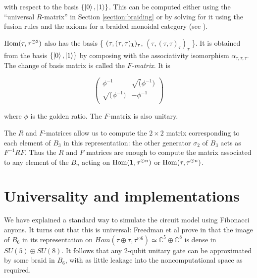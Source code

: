 with respect to the basis $\left\{ \left|0\right>, \left|1\right> \right\}$. This can be
computed either using the ``universal $R$-matrix'' in Section \ref{section:braiding} or
by solving for it using the fusion rules and the axioms for a braided monoidal
category (see \cite{Panangaden}).

$\operatorname{Hom}(\tau, \tau^{\odot 3})$ also has the basis \{ $(\tau,
(\tau,\tau)_{\mathbf{1}})_\tau$, $(\tau, (\tau,\tau)_\tau)_\tau$ \}. It is obtained
from the basis $\left\{ \left|0\right>, \left|1\right> \right\}$ by composing with the
associativity isomorphism $\alpha_{\tau,\tau,\tau}$. The change of basis matrix
is called the \emph{$F$-matrix}. It is

\begin{equation}
\begin{pmatrix}
\phi^{-1} & \sqrt(\phi^{-1}) \\
\sqrt(\phi^{-1}) & -\phi^{-1} \\
\end{pmatrix}
\end{equation}

where $\phi$ is the golden ratio. The $F$-matrix is also unitary.

The $R$ and $F$-matrices allow us to compute the $2 \times 2$ matrix
corresponding to each element of $B_3$ in this representation: the other
generator $\sigma_2$ of $B_3$ acts as $F^{-1}RF$. Thus the $R$ and $F$
matrices are enough to compute the matrix associated to any element of the
$B_n$ acting on $\operatorname{Hom}(\mathbf{1}, \tau^{\odot n})$ or $\operatorname{Hom}(\tau, \tau^{\odot n})$.


\section{Universality and implementations}

We have explained a standard way to simulate the circuit model using
Fibonacci anyons. It turns out that this is universal:
Freedman et al prove in \cite{Freedman2000} that the image of
$B_6$ in its representation on $Hom(\tau \oplus \tau, \tau^{\odot 6}) \simeq
\mathbb{C}^5 \oplus \mathbb{C}^8$ is dense in $SU(5) \oplus SU(8)$. It follows
that any $2$-qubit unitary gate can be approximated by some braid in $B_6$,
with as little leakage into the noncomputational space as required. 


